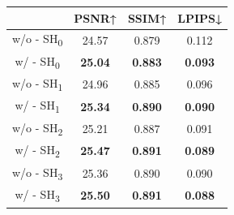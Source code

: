 \begin{tabular}{c|ccc}
\toprule
      & PSNR↑ & SSIM↑ & LPIPS↓ \\
\midrule
w/o - SH\textsubscript{0} & 24.57 & 0.879 & 0.112 \\
w/ - SH\textsubscript{0} & \textbf{25.04} & \textbf{0.883} & \textbf{0.093} \\
\midrule
w/o - SH\textsubscript{1} & 24.96 & 0.885 & 0.096 \\
w/ - SH\textsubscript{1} & \textbf{25.34} & \textbf{0.890 } & \textbf{0.090 } \\
\midrule
w/o - SH\textsubscript{2} & 25.21 & 0.887 & 0.091 \\
w/ - SH\textsubscript{2} & \textbf{25.47} & \textbf{0.891} & \textbf{0.089} \\
\midrule
w/o - SH\textsubscript{3} & 25.36 & 0.890  & 0.090  \\
w/ - SH\textsubscript{3} & \textbf{25.50 } & \textbf{0.891} & \textbf{0.088} \\
\bottomrule
\end{tabular}%
